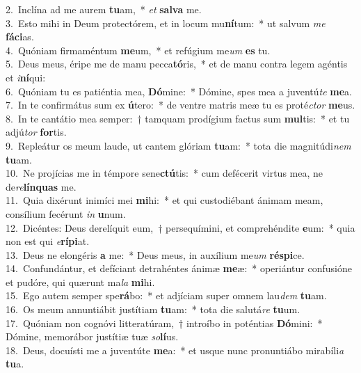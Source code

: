 {2.~}Inclína ad me aurem \textbf{tu}am,~* \textit{et} \textbf{sal}\textbf{va} me.\\
{3.~}Esto mihi in Deum protectórem, et in locum mu\textbf{ní}tum:~* ut salvum \textit{me} \textbf{fá}\textbf{ci}as.\\
{4.~}Quóniam firmaméntum \textbf{me}um,~* et refúgium me\textit{um} \textbf{es} tu.\\
{5.~}Deus meus, éripe me de manu pecca\textbf{tó}ris,~* et de manu contra legem agéntis et \textit{i}\textbf{ní}qui:\\
{6.~}Quóniam tu es patiéntia mea, \textbf{Dó}mine:~* Dómine, spes mea a juventú\textit{te} \textbf{me}a.\\
{7.~}In te confirmátus sum ex \textbf{ú}tero:~* de ventre matris meæ tu es proté\textit{ctor} \textbf{me}us.\\
{8.~}In te cantátio mea semper:~† tamquam prodígium factus sum \textbf{mul}tis:~* et tu adjú\textit{tor} \textbf{for}tis.\\
{9.~}Repleátur os meum laude, ut cantem glóriam \textbf{tu}am:~* tota die magnitúdi\textit{nem} \textbf{tu}am.\\
{10.~}Ne projícias me in témpore sene\textbf{ctú}tis:~* cum defécerit virtus mea, ne de\textit{re}\textbf{lín}\textbf{quas} me.\\
{11.~}Quia dixérunt inimíci mei \textbf{mi}hi:~* et qui custodiébant ánimam meam, consílium fecérunt \textit{in} \textbf{u}num.\\
{12.~}Dicéntes: Deus derelíquit eum,~† persequímini, et comprehéndite \textbf{e}um:~* quia non est qui \textit{e}\textbf{rí}\textbf{pi}at.\\
{13.~}Deus ne elongéris \textbf{a} me:~* Deus meus, in auxílium me\textit{um} \textbf{ré}\textbf{spi}ce.\\
{14.~}Confundántur, et defíciant detrahéntes ánimæ \textbf{me}æ:~* operiántur confusióne et pudóre, qui quærunt ma\textit{la} \textbf{mi}hi.\\
{15.~}Ego autem semper spe\textbf{rá}bo:~* et adjíciam super omnem lau\textit{dem} \textbf{tu}am.\\
{16.~}Os meum annuntiábit justítiam \textbf{tu}am:~* tota die salutá\textit{re} \textbf{tu}um.\\
{17.~}Quóniam non cognóvi litteratúram,~† introíbo in poténtias \textbf{Dó}mini:~* Dómine, memorábor justítiæ tuæ \textit{so}\textbf{lí}us.\\
{18.~}Deus, docuísti me a juventúte \textbf{me}a:~* et usque nunc pronuntiábo mirabíli\textit{a} \textbf{tu}a.\\
